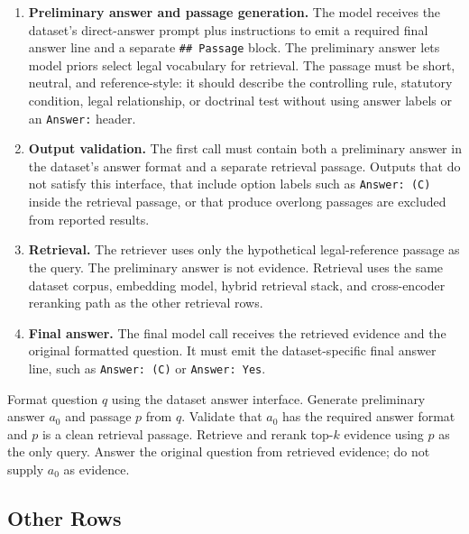 \begin{enumerate}[leftmargin=*]
\item \textbf{Preliminary answer and passage generation.} The model receives the dataset's
direct-answer prompt plus instructions to emit a required final answer line and
a separate \texttt{\#\# Passage} block. The preliminary answer lets model
priors select legal vocabulary for retrieval. The passage must be short,
neutral, and reference-style: it should describe the controlling rule,
statutory condition, legal relationship, or doctrinal test without using answer
labels or an \texttt{Answer:} header.
\item \textbf{Output validation.} The first call must contain both a preliminary answer
in the dataset's answer format and a separate retrieval passage. Outputs that
do not satisfy this interface, that include option labels such as
\texttt{Answer: (C)} inside the retrieval passage, or
that produce overlong passages are excluded from reported results.
\item \textbf{Retrieval.} The retriever uses only the hypothetical
legal-reference passage as the query. The preliminary answer is not evidence.
Retrieval uses the same dataset corpus, embedding model, hybrid retrieval
stack, and cross-encoder reranking path as the other retrieval rows.
\item \textbf{Final answer.} The final model call receives the retrieved
evidence and the original formatted question. It must emit the dataset-specific
final answer line, such as \texttt{Answer: (C)} or \texttt{Answer: Yes}.
\end{enumerate}

\begin{algorithm}[t]
\caption{\hyre{} for one question}
\label{alg:snaphyre}
\begin{algorithmic}[1]
\STATE Format question $q$ using the dataset answer interface.
\STATE Generate preliminary answer $a_0$ and passage $p$ from $q$.
\STATE Validate that $a_0$ has the required answer format and $p$ is a clean retrieval passage.
\STATE Retrieve and rerank top-$k$ evidence using $p$ as the only query.
\STATE Answer the original question from retrieved evidence; do not supply $a_0$ as evidence.
\end{algorithmic}
\end{algorithm}

\subsection{Other Rows}
